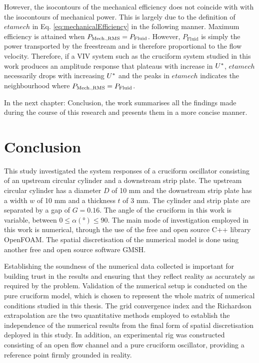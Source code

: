 \documentclass[oneside]{utmthesis}
\begin{document}
However, the isocontours of the mechanical efficiency does not coincide with with the isocontours of mechanical power. This is largely due to the definition of $etamech$ in Eq. \ref{eq:mechanicalEfficiency} in the following manner. Maximum efficiency is attained when $P_{\text{Mech.,RMS}} = P_{\text{Fluid}}$. However, $P_{\text{Fluid}}$ is simply the power transported by the freestream and is therefore proportional to the flow velocity. Therefore, if a VIV system such as the cruciform system studied in this work produces an amplitude response that plateaus with increase in $U^{*}$, $etamech$ necessarily drops with increasing $U^{*}$ and the peaks in $etamech$ indicates the neighbourhood where $P_{\text{Mech.,RMS}} = P_{\text{Fluid}}$.

In the next chapter: Conclusion, the work summarises all the findings made during the course of this research and presents them in a more concise manner.

\chapter{Conclusion} \label{chap:conclusion}
This study investigated the system responses of a cruciform oscillator consisting of an upstream circular cylinder and a downstream strip plate. The upstream circular cylinder has a diameter $D$ of 10 mm and the downstream strip plate has a width $w$ of 10 mm and a thickness $t$ of 3 mm.  The cylinder and strip plate are separated by a gap of $G = 0.16$. The angle of the cruciform in this work is variable, between $0 \leq \alpha (\si{\degree}) \leq 90$. The main mode of investigation employed in this work is numerical, through the use of the free and open source C++ library OpenFOAM. The spatial discretisation of the numerical model is done using another free and open source software GMSH.

Establishing the soundness of the numerical data collected is important for building trust in the results and ensuring that they reflect reality as accurately as required by the problem. Validation of the numerical setup is conducted on the pure cruciform model, which is chosen to represent the whole matrix of numerical conditions studied in this thesis. The grid convergence index and the Richardson extrapolation are the two quantitative methods employed to establish the independence of the numerical results from the final form of spatial discretisation deployed in this study. In addition, an experimental rig was constructed consisting of an open flow channel and a pure cruciform oscillator, providing a reference point firmly grounded in reality.
\end{document}
